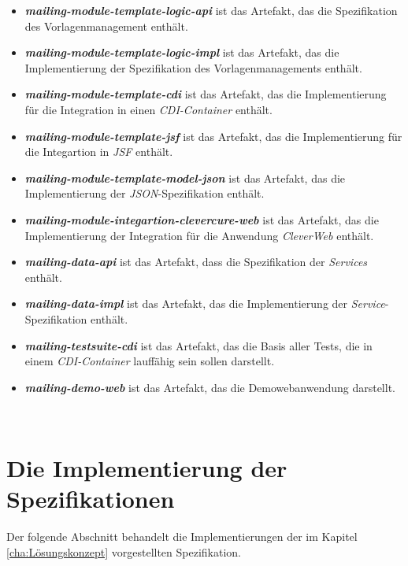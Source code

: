 \begin{itemize}
	\item\emph{\textbf{mailing-module-template-logic-api}} ist das Artefakt, das die Spezifikation des Vorlagenmanagement enthält.
	\item\emph{\textbf{mailing-module-template-logic-impl}} ist das Artefakt, das die Implementierung der Spezifikation des Vorlagenmanagements enthält.
	\item\emph{\textbf{mailing-module-template-cdi}} ist das Artefakt, das die Implementierung für die Integration in einen \emph{CDI-Container} enthält.
	\item\emph{\textbf{mailing-module-template-jsf}} ist das Artefakt, das die Implementierung für die Integartion in \emph{JSF} enthält.
	\item\emph{\textbf{mailing-module-template-model-json}} ist das Artefakt, das die Implementierung der \emph{JSON}-Spezifikation enthält.
	\item\emph{\textbf{mailing-module-integartion-clevercure-web}} ist das Artefakt, das die Implementierung der Integration für die Anwendung \emph{CleverWeb} enthält.
	\item\emph{\textbf{mailing-data-api}} ist das Artefakt, dass die Spezifikation der \emph{Services} enthält.
	\item\emph{\textbf{mailing-data-impl}} ist das Artefakt, das die Implementierung der \emph{Service}-Spezifikation enthält.
	\item\emph{\textbf{mailing-testsuite-cdi}} ist das Artefakt, das die Basis aller Tests, die in einem \emph{CDI-Container} lauffähig sein sollen darstellt.
	\item\emph{\textbf{mailing-demo-web}} ist das Artefakt, das die Demowebanwendung darstellt.
\end{itemize} 
\ \newline


\section{Die Implementierung der Spezifikationen}
Der folgende Abschnitt behandelt die Implementierungen der im Kapitel \ref{cha:Lösungskonzept} vorgestellten Spezifikation.

